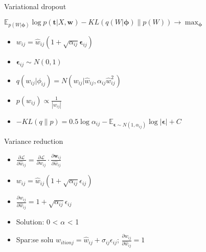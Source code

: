 \documentclass[14pt,mathserif,aspectratio=43,unicode]{beamer}
\newcommand{\w}{\mathbf{w}}
\newcommand{\T}{\mathbf{t}}
\newcommand{\pHi}{\mathbf{\phi}}
\newcommand{\Eps}{\mathbf{\epsilon}}
\begin{document}

\begin{frame}{Variational dropout}
    
    $ \mathbb{E}_{p(W | \pHi)} \log p(\T|X,\w) - KL(q(W|\pHi)\|p(W)) \rightarrow \max_{\pHi} $
    
    \begin{itemize}
        \item $ w_{ij} = \hat{w}_{ij} (1 + \sqrt{\alpha_{ij}} \Eps_{ij}) $
        \item $\Eps_{ij} \sim N(0, 1)$
        \item $q(w_{ij}|\phi_{ij})=N(w_{ij}|\hat{w}_{ij},\alpha_{ij}\hat{w}_{ij}^2)$
        \item $p(w_{ij}) \propto \frac{1}{|w_{ij}|} $
    
        \pause
    
        \item $-KL(q\|p) = 0.5\log \alpha_{ij}-\mathbb{E}_{\Eps \sim N(1, \alpha_{ij})}\log|\Eps|+C$
    \end{itemize}

\end{frame}


\begin{frame}{Variance reduction}
    
    \begin{itemize}
        \item $\frac{\partial\mathcal{L}}{\partial \hat{w}_{ij}}=\frac{\partial\mathcal{L}}{\partial w_{ij}}\cdot\frac{\partial \w_{ij}}{\partial \hat{w}_{ij}}$
        \item $w_{ij}=\hat{w}_{ij}(1+\sqrt{\alpha_{ij}}\epsilon_{ij})$
        \item $\frac{\partial w_{ij}}{\partial \hat{w}_{ij}}=1+\sqrt{\alpha_{ij}}\epsilon_{ij}$
        \item Solution: 0 < $\alpha$ < 1
        \pause
        \item Spar:se solu $w_{itionj} = \hat{w}_{ij} + \sigma_{ij}\epsilon_{ij}$; $\frac{\partial w_{ij}}{\partial \hat{w}_{ij}}=1$
    \end{itemize}
\end{frame}
\end{document}
